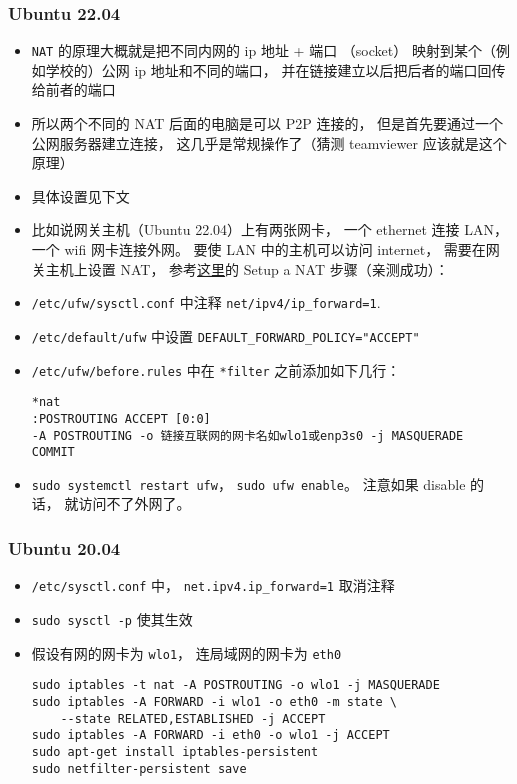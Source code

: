 \subsubsection{Ubuntu 22.04}
\begin{itemize}
\item \verb|NAT| 的原理大概就是把不同内网的 ip 地址 + 端口 （socket） 映射到某个（例如学校的）公网 ip 地址和不同的端口， 并在链接建立以后把后者的端口回传给前者的端口
\item 所以两个不同的 NAT 后面的电脑是可以 P2P 连接的， 但是首先要通过一个公网服务器建立连接， 这几乎是常规操作了（猜测 teamviewer 应该就是这个原理）
\item 具体设置见下文
\item 比如说网关主机（Ubuntu 22.04）上有两张网卡， 一个 ethernet 连接 LAN， 一个 wifi 网卡连接外网。 要使 LAN 中的主机可以访问 internet， 需要在网关主机上设置 NAT， 参考\href{https://unix.stackexchange.com/questions/575178/sharing-wifi-internet-through-ethernet-interface}{这里}的 Setup a NAT 步骤（亲测成功）：
\item \verb|/etc/ufw/sysctl.conf| 中注释 \verb|net/ipv4/ip_forward=1|.
\item \verb|/etc/default/ufw| 中设置 \verb|DEFAULT_FORWARD_POLICY="ACCEPT"|
\item \verb|/etc/ufw/before.rules| 中在 \verb`*filter` 之前添加如下几行：
\begin{lstlisting}[language=none]
*nat
:POSTROUTING ACCEPT [0:0]
-A POSTROUTING -o 链接互联网的网卡名如wlo1或enp3s0 -j MASQUERADE
COMMIT
\end{lstlisting}
\item \verb|sudo systemctl restart ufw|， \verb|sudo ufw enable|。 注意如果 disable 的话， 就访问不了外网了。
\end{itemize}

\subsubsection{Ubuntu 20.04}
\begin{itemize}
\item \verb`/etc/sysctl.conf` 中， \verb`net.ipv4.ip_forward=1` 取消注释
\item \verb`sudo sysctl -p` 使其生效
\item 假设有网的网卡为 \verb`wlo1`， 连局域网的网卡为 \verb`eth0`
\begin{lstlisting}[language=none]
sudo iptables -t nat -A POSTROUTING -o wlo1 -j MASQUERADE
sudo iptables -A FORWARD -i wlo1 -o eth0 -m state \
    --state RELATED,ESTABLISHED -j ACCEPT
sudo iptables -A FORWARD -i eth0 -o wlo1 -j ACCEPT
sudo apt-get install iptables-persistent
sudo netfilter-persistent save
\end{lstlisting}
\end{itemize}

